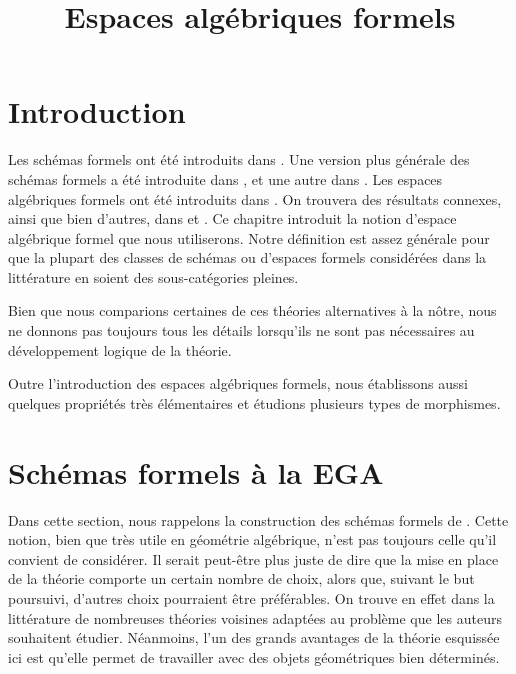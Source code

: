 

%


\title{Espaces algébriques formels}


\maketitle

\label{section-phantom}

\tableofcontents

\section{Introduction}
\label{section-introduction}

\noindent
Les schémas formels ont été introduits dans \cite{EGA}. Une version plus générale
des schémas formels a été introduite dans \cite{McQuillan}, et une autre
dans \cite{Yasuda}. Les espaces algébriques formels ont été introduits dans \cite{Kn}.
On trouvera des résultats connexes, ainsi que bien d'autres, dans
\cite{Abbes} et \cite{Fujiwara-Kato}.
Ce chapitre introduit la notion d'espace algébrique formel
que nous utiliserons. Notre définition est assez générale pour que la plupart
des classes de schémas ou d'espaces formels considérées dans la littérature en soient des sous-catégories pleines.

\medskip\noindent
Bien que nous comparions certaines de ces théories alternatives
à la nôtre, nous ne donnons pas toujours tous les détails lorsqu'ils ne sont pas nécessaires
au développement logique de la théorie.

\medskip\noindent
Outre l'introduction des espaces algébriques formels, nous établissons aussi quelques
propriétés très élémentaires et étudions plusieurs types de morphismes.










\section{Schémas formels à la EGA}
\label{section-formal-schemes-EGA}

\noindent
Dans cette section, nous rappelons la construction des schémas formels de \cite{EGA}.
Cette notion, bien que très utile en géométrie algébrique,
n'est pas toujours celle qu'il convient de considérer. Il serait peut-être plus juste de dire
que la mise en place de la théorie comporte un certain nombre de choix, alors que, suivant
le but poursuivi, d'autres choix pourraient être préférables. On trouve en effet dans la littérature
de nombreuses théories voisines
adaptées au problème que les auteurs souhaitent étudier. Néanmoins, l'un
des grands avantages de la théorie esquissée ici est qu'elle permet de travailler
avec des objets géométriques bien déterminés.

